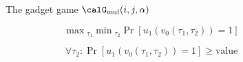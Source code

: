 \documentclass[english, aspectratio=169]{beamer}
\newcommand{\Gmul}{\ensuremath{\calG_{\mathrm{mul}}}}
\begin{document}
\begin{frame}
\begin{figure}
    \caption{The gadget game $\Gmul(i,j,\alpha)$}
    \label{fig:Gmul}
  \end{figure}

\end{frame}

\begin{frame}
	\begin{equation*}
		\max {}_{\tau_1}
		\min {}_{\tau_2}
	 	\Pr \left[ u_1(v_0(\tau_1, \tau_2)) = 1 \right]
	\end{equation*}
	
	\begin{equation*}
		\forall \tau_2 : \Pr \left[ u_1(v_0(\tau_1,\tau_2)) = 1 \right] \geq \text{value}
	\end{equation*}
\end{frame}
\end{document}
